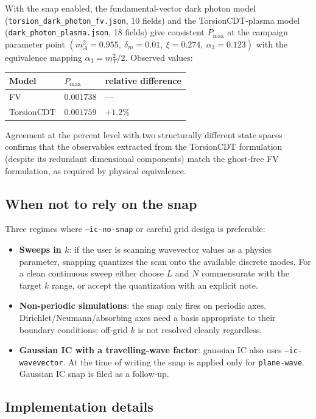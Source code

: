 With the snap enabled, the fundamental-vector dark photon model
(\texttt{torsion\_dark\_photon\_fv.json}, 10 fields) and the
TorsionCDT-plasma model
(\texttt{dark\_photon\_plasma.json}, 18 fields) give consistent
$P_{\max}$ at the campaign parameter point
$(m_A^2 = 0.955,\ \delta_m = 0.01,\ \xi = 0.274,\ \alpha_3 = 0.123)$ with the
equivalence mapping $\alpha_3 = m_T^2 / 2$. Observed values:
\begin{center}
\begin{tabular}{lll}
Model & $P_{\max}$ & relative difference \\ \hline
FV        & $0.001738$ & --- \\
TorsionCDT & $0.001759$ & $+1.2\%$ \\
\end{tabular}
\end{center}
Agreement at the percent level with two structurally different state
spaces confirms that the observables extracted from the TorsionCDT
formulation (despite its redundant dimensional components) match the
ghost-free FV formulation, as required by physical equivalence.

\subsection{When not to rely on the snap}

Three regimes where \texttt{--ic-no-snap} or careful grid design is
preferable:
\begin{itemize}
  \item \textbf{Sweeps in $k$}: if the user is scanning wavevector
        values as a physics parameter, snapping quantizes the scan
        onto the available discrete modes. For a clean continuous
        sweep either choose $L$ and $N$ commensurate with the target
        $k$ range, or accept the quantization with an explicit note.
  \item \textbf{Non-periodic simulations}: the snap only fires on
        periodic axes. Dirichlet/Neumann/absorbing axes need a basis
        appropriate to their boundary conditions; off-grid $k$ is not
        resolved cleanly regardless.
  \item \textbf{Gaussian IC with a travelling-wave factor}: gaussian
        IC also uses \texttt{--ic-wavevector}. At the time of writing
        the snap is applied only for \texttt{plane-wave}. Gaussian IC
        snap is filed as a follow-up.
\end{itemize}

\subsection{Implementation details}

